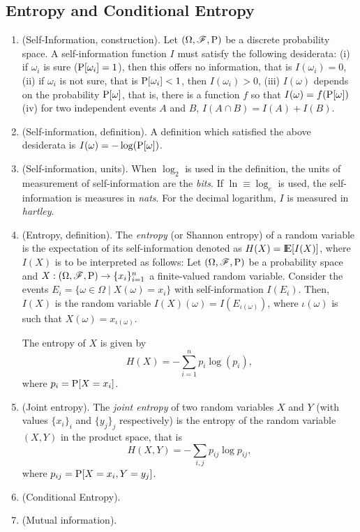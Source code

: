 \documentclass[a4paper,10pt]{article}
\begin{document}
\subsection{Entropy and Conditional Entropy}
\begin{enumerate}
 \item (Self-Information, construction). Let $(\Omega,\mathscr{F},\mathrm{P})$ be a discrete probability space. A self-information function $I$ must satisfy the 
       following desiderata: 
       (i) if $\omega_i$ is sure ($\mathrm{P}[\omega_i]=1$), then this offers no information, that is $I(\omega_i)=0$, 
       (ii) if $\omega_i$ is not sure, that is $\mathrm{P}[\omega_i]<1$, then $I(\omega_i)>0$,
       (iii) $I(\omega)$ depends on the probability $\mathrm{P}[\omega]$, that is, there is a function $f$ so that $I(\omega)=f(\mathrm{P}[\omega])$
       (iv) for two independent events $A$ and $B$, $I(A\cap B)=I(A)+I(B)$.
 \item (Self-information, definition). A definition which satisfied the above desiderata is $I(\omega)=-\log(\mathrm{P}[\omega])$. 
 \item (Self-information, units). When $\log_2$ is used in the definition, the units of measurement of self-information are the \textit{bits}.
       If $\ln\equiv \log_e$ is used, the self-information is measures in \textit{nats}. 
       For the decimal logarithm, $I$ is measured in \textit{hartley}.
 \item (Entropy, definition). The \textit{entropy} (or Shannon entropy) of a random variable is the expectation of its self-information denoted 
       as $H(X)=\E[I(X)]$, where $I(X)$ is to be interpreted as follows: Let $(\Omega,\mathscr{F},\mathrm{P})$ be a probability space and $X:(\Omega,\mathscr{F},\mathrm{P})\to \{x_i\}_{i=1}^{n}$
       a finite-valued random variable. Consider the events $E_i=\{\omega\in\Omega {}\mid{} X(\omega) = x_i\}$ with self-information 
       $I(E_i)$. Then, $I(X)$ is the random variable $I(X)(\omega) = I(E_{\iota(\omega)})$, where $\iota(\omega)$ is such 
       that $X(\omega) = x_{\iota(\omega)}$.
       
       The entropy of $X$ is given by
       \[
        H(X) = -\sum_{i=1}^{n}p_i \log(p_i),
       \]
       where $p_i = \mathrm{P}[X=x_i]$.
 \item (Joint entropy). The \textit{joint entropy} of two random variables $X$ and $Y$ (with values $\{x_i\}_i$ and $\{y_j\}_j$
       respectively) is the entropy of the random variable 
       $(X,Y)$ in the product space, that is
       \[
        H(X,Y) = -\sum_{i,j}p_{ij}\log p_{ij},
       \]
       where $p_{ij} = \mathrm{P}[X=x_i, Y=y_j]$.
 \item (Conditional Entropy).
 \item (Mutual information).
\end{enumerate}
\end{document}
